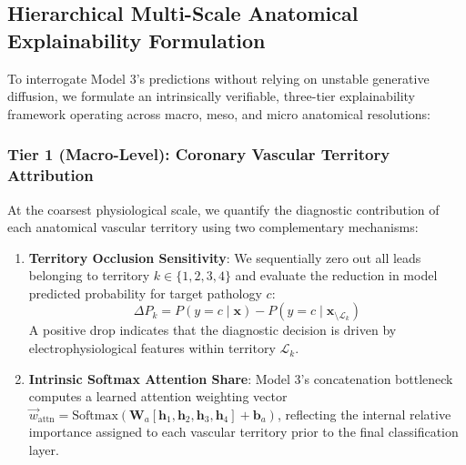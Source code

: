 \documentclass[12pt]{elsarticle}
\begin{document}
\subsection{Hierarchical Multi-Scale Anatomical Explainability Formulation}
To interrogate Model 3's predictions without relying on unstable generative diffusion, we formulate an intrinsically verifiable, three-tier explainability framework operating across macro, meso, and micro anatomical resolutions:

\subsubsection{Tier 1 (Macro-Level): Coronary Vascular Territory Attribution}
At the coarsest physiological scale, we quantify the diagnostic contribution of each anatomical vascular territory using two complementary mechanisms:
\begin{enumerate}
    \item \textbf{Territory Occlusion Sensitivity}: We sequentially zero out all leads belonging to territory $k \in \{1, 2, 3, 4\}$ and evaluate the reduction in model predicted probability for target pathology $c$:
    \begin{equation}
    \Delta P_k = P(y = c \mid \mathbf{x}) - P(y = c \mid \mathbf{x}_{\setminus \mathcal{L}_k})
    \end{equation}
    A positive drop indicates that the diagnostic decision is driven by electrophysiological features within territory $\mathcal{L}_k$.
    \item \textbf{Intrinsic Softmax Attention Share}: Model 3's concatenation bottleneck computes a learned attention weighting vector $\vec{w}_{\text{attn}} = \text{Softmax}(\mathbf{W}_a [\mathbf{h}_1, \mathbf{h}_2, \mathbf{h}_3, \mathbf{h}_4] + \mathbf{b}_a)$, reflecting the internal relative importance assigned to each vascular territory prior to the final classification layer.
\end{enumerate}
\end{document}
